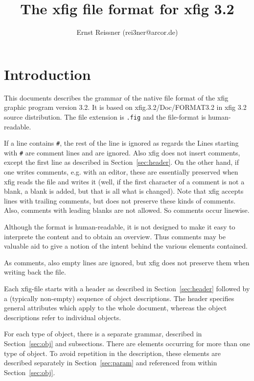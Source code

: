 \documentclass[10pt, a4paper]{article}
\title{The xfig file format for xfig 3.2 }
\author{Ernst Reissner (rei3ner@arcor.de)}
\begin{document}
\maketitle
\tableofcontents

\section{Introduction}

This documents describes the grammar 
of the native file format of the xfig graphic program version 3.2. 
It is based on xfig.3.2/Doc/FORMAT3.2 in xfig 3.2 source distribution. 
The file extension is {\tt.fig} and the file-format is human-readable. 

If a line contains {\tt\#}, 
the rest of the line is ignored as regards the 
Lines starting with {\tt\#} are comment lines and are ignored. 
Also xfig does not insert comments, 
except the first line as described in Section~\ref{sec:header}. 
On the other hand, if one writes comments, e.g. with an editor, 
these are essentially preserved when xfig reads the file and writes it 
(well, if the first character of a comment is not a blank, 
a blank is added, but that is all what is changed). 
Note that xfig accepts lines with trailing comments, 
but does not preserve these kinds of comments. 
Also, comments with leading blanks are not allowed. 
So comments occur linewise. 

Although the format is human-readable, 
it is not designed to make it easy to interprete the content 
and to obtain an overview. 
Thus comments may be valuable aid to give a notion 
of the intent behind the various elements contained. 

As comments, also empty lines are ignored, 
but xfig does not preserve them when writing back the file. 

Each xfig-file starts with a header as described in Section~\ref{sec:header} 
followed by a (typically non-empty) sequence of object descriptions. 
The header specifies general attributes which apply to the whole document, 
whereas the object descriptions refer to individual objects. 

For each type of object, there is a separate grammar, 
described in Section~\ref{sec:obj} and subsections. 
There are elements occurring for more than one type of object. 
To avoid repetition in the description, 
these elements are described separately in Section~\ref{sec:param} 
and referenced from within Section~\ref{sec:obj}. 
\end{document}
